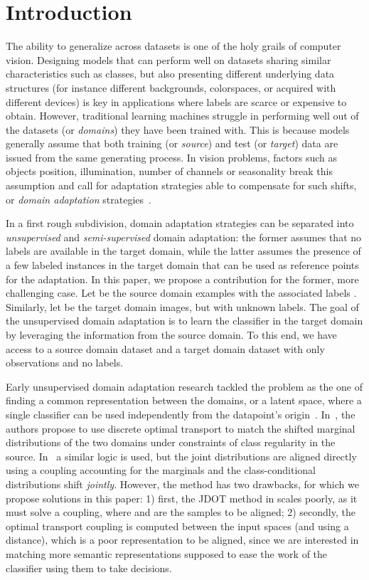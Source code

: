 \documentclass[runningheads]{llncs}
\begin{document}
\section{Introduction}
\label{sec:Int}
The ability to generalize across datasets is one of the holy grails of computer vision. Designing models that can perform well on datasets sharing similar characteristics such as classes, but also presenting different underlying data structures (for instance different backgrounds, colorspaces, or acquired with different devices) is key in applications where labels are scarce or expensive to obtain. However, traditional learning machines struggle in performing well out of the datasets (or \emph{domains}) they have been trained with. This is because models generally assume that both training (or \emph{source}) and test (or \emph{target}) data are issued from the same generating process. In vision problems, factors such as objects position, illumination, number of channels or seasonality break this assumption and call for adaptation strategies able to compensate for such shifts, or \emph{domain adaptation} strategies~\cite{Pat15}.

In a first rough subdivision, domain adaptation strategies can be separated into \emph{unsupervised} and \emph{semi-supervised} domain adaptation: the former assumes that no labels are available in the target domain, while the latter assumes the presence of a few labeled instances in the target domain that can be used as reference points for the adaptation. In this paper, we propose a contribution for the former, more challenging case. 
Let  be the source domain examples with the associated labels . Similarly, let  be the target domain images, but with unknown labels. The goal of the unsupervised domain adaptation is to learn the classifier  in the target domain by leveraging the information from the source domain. To this end, we have access to a source domain dataset  and a target domain dataset  with only observations and no labels.

Early unsupervised domain adaptation research tackled the problem as the one of finding a common representation between the domains, or a latent space, where a single classifier can be used independently from the datapoint's origin~\cite{saenko10,gopalan11}. In~\cite{Cou17}, the authors propose to use discrete optimal transport to match the shifted marginal distributions of the two domains under constraints of class regularity in the source. In~\cite{courty2017joint} a similar logic is used, but the joint distributions are aligned directly using a coupling accounting for the marginals and the class-conditional distributions shift \emph{jointly}. However, the method has two drawbacks, for which we propose solutions in this paper: 1) first, the JDOT method in \cite{courty2017joint} scales poorly, as it must solve a  coupling, where  and  are the samples to be aligned; 2) secondly, the optimal transport coupling  is computed between the input spaces (and using a  distance), which is a poor representation to be aligned, since we are interested in matching more semantic representations supposed to ease the work of the classifier using them to take decisions.
\end{document}

